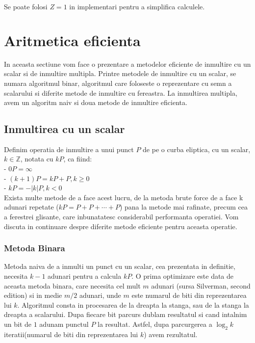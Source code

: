 \begin{obs}
Se poate folosi $Z = 1$ in implementari pentru a simplifica calculele.
\end{obs}

\section{Aritmetica eficienta}
\label{sec:sec02}

In aceasta sectiune vom face o prezentare a metodelor eficiente de inmultire cu un scalar si de inmultire multipla. Printre metodele de inmultire cu un scalar, se numara algoritmul binar, algoritmul care foloseste o reprezentare cu semn a scalarului si diferite metode de inmultire cu fereastra. La inmultirea multipla, avem un algoritm naiv si doua metode de inmultire eficienta. 

\subsection{Inmultirea cu un scalar}

\begin{dfn}
Definim operatia de inmultire a unui punct $P$ de pe o curba eliptica, cu un scalar, $k\in \mathbb{Z}$, notata cu $kP$, ca fiind: \\
- $0P = \infty$ \\
- $(k+1)P = kP + P, k\geq 0$ \\
- $kP = -|k|P, k < 0$ \\
Exista multe metode de a face acest lucru, de la metoda brute force de a face k adunari repetate ($kP = P+P+\cdots +P$) pana la metode mai rafinate, precum cea a ferestrei glisante, care inbunatatesc considerabil performanta operatiei. Vom discuta in continuare despre diferite metode eficiente pentru aceasta operatie.
\end{dfn}

\subsubsection{Metoda Binara}

Metoda naiva de a inmulti un punct cu un scalar, cea prezentata in definitie, necesita $k-1$ adunari pentru a calcula $kP$. O prima optimizare este data de aceasta metoda binara, care necesita cel mult $m$ adunari (sursa Silverman, second edition) si in medie $m/2$ adunari, unde $m$ este numarul de biti din reprezentarea lui $k$. Algoritmul consta in procesarea de la dreapta la stanga, sau de la stanga la dreapta a scalarului. Dupa fiecare bit parcurs dublam resultatul si cand intalnim un bit de $1$ adunam punctul $P$ la resultat. Astfel, dupa parcurgerea a $\log_2 k$ iteratii(numarul de biti din reprezentarea lui $k$) avem rezultatul.

